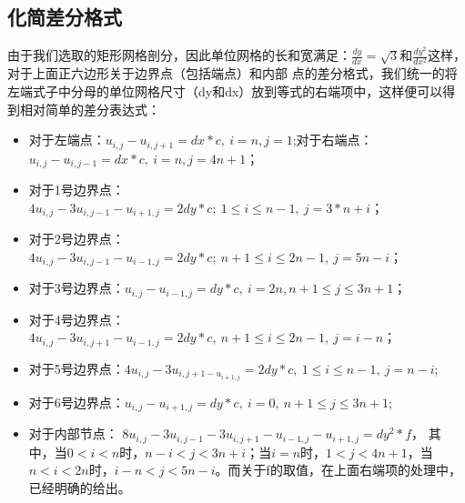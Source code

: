 \documentclass[a4paper,11pt]{ctexart} %
\begin{document}
\subsection{化简差分格式}
由于我们选取的矩形网格剖分，因此单位网格的长和宽满足：$\frac{dy}{dx}=\sqrt{3}$和$\frac{dy^2}{dx^2}$这样，对于上面正六边形关于边界点（包括端点）和内部
点的差分格式，我们统一的将左端式子中分母的单位网格尺寸（dy和dx）放到等式的右端项中，这样便可以得到相对简单的差分表达式：
\begin{itemize}
\item 对于左端点：$u_{i,j}-u_{i,j+1}=dx*c,\ i=n,j=1$;对于右端点：$u_{i,j}-u_{i,j-1}=dx*c,\ i=n,j=4n+1$；
\item 对于1号边界点：$4u_{i,j}-3u_{i,j-1}-u_{i+1,j}=2dy*c;\ 1\leq i\leq n-1,\ j=3*n+i$；
\item 对于2号边界点：$4u_{i,j}-3u_{i,j-1}-u_{i-1,j}=2dy*c;\ n+1\leq i\leq 2n-1,\ j=5n-i$；
\item 对于3号边界点：$u_{i,j}-u_{i-1,j}=dy*c,\ i=2n,n+1\leq j\leq 3n+1$；
\item 对于4号边界点：$4u_{i,j}-3u_{i,j+1}-u_{i-1,j}=2dy*c,\ n+1\leq i\leq 2n-1,\ j=i-n$；
\item 对于5号边界点：$4u_{i,j}-3u_{i,j+1-u_{i+1,j}}=2dy*c,\ 1\leq i\leq n-1,\ j=n-i$;
\item 对于6号边界点：$u_{i,j}-u_{i+1,j}=dy*c,\ i=0,\ n+1\leq j\leq 3n+1$;
\item 对于内部节点： $8u_{i,j}-3u_{i,j-1}-3u_{i,j+1}-u_{i-1,j}-u_{i+1,j}=dy^2*f $，
其中，当$0<i<n$时，$n-i<j<3n+i$；当$i=n$时，$1<j<4n+1$，当$n<i<2n$时，$i-n<j<5n-i$。而关于f的取值，在上面右端项的处理中，已经明确的给出。
\end{itemize}
\end{document}
